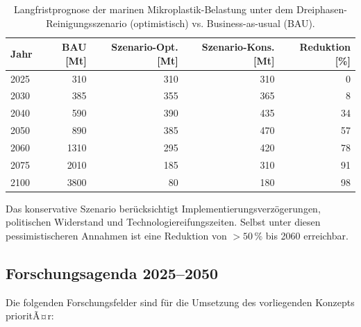 ﻿\documentclass[12pt,a4paper]{article}
\theoremstyle{definition}
\theoremstyle{remark}
\begin{document}
\begin{table}[H]
\centering
\caption{Langfristprognose der marinen Mikroplastik-Belastung unter dem
  Dreiphasen-Reinigungsszenario (optimistisch) vs. Business-as-usual (BAU).}
\label{tab:prognose}
\begin{tabular}{lrrrr}
\toprule
\textbf{Jahr} & \textbf{BAU [Mt]} & \textbf{Szenario-Opt. [Mt]} & \textbf{Szenario-Kons. [Mt]} & \textbf{Reduktion [\%]} \\
\midrule
2025 & 310 & 310 & 310 & 0 \\
2030 & 385 & 355 & 365 & 8 \\
2040 & 590 & 390 & 435 & 34 \\
2050 & 890 & 385 & 470 & 57 \\
2060 & 1310 & 295 & 420 & 78 \\
2075 & 2010 & 185 & 310 & 91 \\
2100 & 3800 & 80 & 180 & 98 \\
\bottomrule
\end{tabular}
\end{table}

Das konservative Szenario ber\"ucksichtigt Implementierungsverz\"ogerungen,
politischen Widerstand und Technologiereifungszeiten. Selbst unter diesen
pessimistischeren Annahmen ist eine Reduktion von $> 50\,\%$ bis 2060
erreichbar.

\subsection{Forschungsagenda 2025--2050}

Die folgenden Forschungsfelder sind f\"ur die Umsetzung des vorliegenden
Konzepts prioritÃ¤r:
\end{document}

